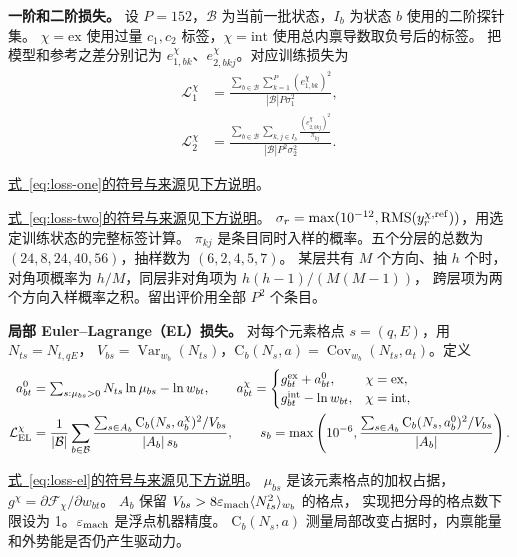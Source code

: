 \documentclass[UTF8,fontset=fandol,11pt]{ctexart}
\newcommand{\fref}[2]{\par{\footnotesize \hyperref[#1]{式~\ref{#1}的符号与来源}见\hyperref[#2]{下方说明}。}}
\newcommand{\defat}[1]{\phantomsection\label{#1}}
\begin{document}
\textbf{一阶和二阶损失。} 设 $P=152$，$\mathcal B$ 为当前一批状态，$I_b$ 为状态 $b$ 使用的二阶探针集。
$\chi=\mathrm{ex}$ 使用过量 $c_1,c_2$ 标签，$\chi=\mathrm{int}$ 使用总内禀导数取负号后的标签。
把模型和参考之差分别记为 $e^{\chi}_{1,bk}$、$e^{\chi}_{2,bkj}$。对应训练损失为
\begin{align}
\mathcal L_1^\chi
 &=\frac{\displaystyle\sum_{b\in\mathcal B}\sum_{k=1}^{P}
    (e^{\chi}_{1,bk})^2}{|\mathcal B|P\sigma_1^2},\label{eq:loss-one}\\
\mathcal L_2^\chi
 &=\frac{\displaystyle\sum_{b\in\mathcal B}\sum_{k,j\in I_b}
    \frac{(e^{\chi}_{2,bkj})^2}{\pi_{kj}}}{|\mathcal B|P^2\sigma_2^2}.
    \label{eq:loss-two}
\end{align}
\fref{eq:loss-one}{def:loss-proj}
\fref{eq:loss-two}{def:loss-proj}
\defat{def:loss-proj}
$\sigma_r=\max(10^{-12},\operatorname{RMS}(y_r^{\chi,\rm ref}))$，用选定训练状态的完整标签计算。
$\pi_{kj}$ 是条目同时入样的概率。五个分层的总数为 $(24,8,24,40,56)$，抽样数为 $(6,2,4,5,7)$。
某层共有 $M$ 个方向、抽 $h$ 个时，对角项概率为 $h/M$，同层非对角项为 $h(h-1)/(M(M-1))$，
跨层项为两个方向入样概率之积。留出评价用全部 $P^2$ 个条目。

\textbf{局部 Euler--Lagrange（EL）损失。} 对每个元素格点 $s=(q,E)$，用 $N_{ts}=N_{t,qE}$，
$V_{bs}=\operatorname{Var}_{w_b}(N_{ts})$，$\mathrm C_b(N_s,a)=\operatorname{Cov}_{w_b}(N_{ts},a_t)$。定义
\begin{equation}
\begin{aligned}
a^{0}_{bt}&=\textstyle\sum_{s:\mu_{bs}>0} N_{ts}\ln\mu_{bs}-\ln w_{bt},
\qquad
a^{\chi}_{bt}=
\begin{cases}
g_{bt}^{\rm ex}+a^{0}_{bt},&\chi=\mathrm{ex},\\
g_{bt}^{\rm int}-\ln w_{bt},&\chi=\mathrm{int},
\end{cases}\\
\mathcal L_{\rm EL}^{\chi}
 &=\frac{1}{|\mathcal B|}\sum_{b\in\mathcal B}
 \frac{\sum_{s\in A_b}\mathrm C_b(N_s,a^{\chi}_b)^2/V_{bs}}
 {|A_b|\,s_b},\qquad
 s_b=\max\left(10^{-6},
 \frac{\sum_{s\in A_b}\mathrm C_b(N_s,a^{0}_b)^2/V_{bs}}{|A_b|}\right).
\end{aligned}
\label{eq:loss-el}
\end{equation}
\fref{eq:loss-el}{def:loss-el}
\defat{def:loss-el}
$\mu_{bs}$ 是该元素格点的加权占据，$g^\chi=\partial\mathcal F_\chi/\partial w_{bt}$。
$A_b$ 保留 $V_{bs}>8\varepsilon_{\rm mach}\langle N_{ts}^2\rangle_{w_b}$ 的格点，
实现把分母的格点数下限设为 1。$\varepsilon_{\rm mach}$ 是浮点机器精度。
$\mathrm C_b(N_s,a)$ 测量局部改变占据时，内禀能量和外势能是否仍产生驱动力。
\end{document}
